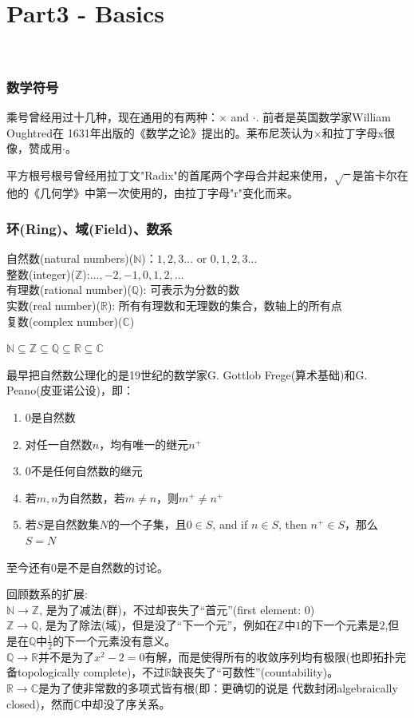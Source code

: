 \documentclass[../main.tex]{subfiles}
\begin{document}
\clearpage
\part{Part3 - Basics}\

\section{数学符号}
乘号曾经用过十几种，现在通用的有两种：$\times$ and $\cdot$. 前者是英国数学家William Oughtred在 1631年出版的《数学之论》提出的。莱布尼茨认为$\times$和拉丁字母x很像，赞成用$\cdot$。

平方根号根号曾经用拉丁文"Radix"的首尾两个字母合并起来使用，$\sqrt{\phantom{x}}$是笛卡尔在他的《几何学》中第一次使用的，由拉丁字母"r"变化而来。

\section{环(Ring)、域(Field)、数系}
自然数(natural numbers)($\mathbb{N}$)：$1,2,3\ldots$ or $0,1,2,3\ldots$\\
整数(integer)($\mathbb{Z}$):$\ldots, -2, -1, 0, 1, 2, \ldots$\\
有理数(rational number)($\mathbb{Q}$): 可表示为分数的数\\
实数(real number)($\mathbb{R}$): 所有有理数和无理数的集合，数轴上的所有点\\
复数(complex number)($\mathbb{C}$)

$\mathbb{N} \subseteq \mathbb{Z} \subseteq \mathbb{Q} \subseteq \mathbb{R} \subseteq \mathbb{C}$

最早把自然数公理化的是19世纪的数学家G. Gottlob Frege(算术基础)和G. Peano(皮亚诺公设)，即：
\vspace{-0.5em}
\begin{enumerate}
  \item $0$是自然数
  \item 对任一自然数$n$，均有唯一的继元$n^{+}$
  \item $0$不是任何自然数的继元
  \item 若$m, n$为自然数，若$m\neq n$，则$m^{+}\neq n^+$
  \item 若$S$是自然数集$N$的一个子集，且$0\in S$, and if $n \in S$, then $n^+\in S$，那么 $S=N$
\end{enumerate}
至今还有$0$是不是自然数的讨论。

回顾数系的扩展:\\
$\mathbb{N} \rightarrow \mathbb{Z}$, 是为了减法(群)，不过却丧失了“首元”(first element: 0)\\
$\mathbb{Z} \rightarrow \mathbb{Q}$, 是为了除法(域)，但是没了“下一个元”，例如在$\mathbb{Z}$中$1$的下一个元素是$2$,但是在$\mathbb{Q}$中$\frac{1}{2}$的下一个元素没有意义。\\
$\mathbb{Q} \rightarrow \mathbb{R}$并不是为了$x^2-2=0$有解，而是使得所有的收敛序列均有极限(也即拓扑完备topologically complete)，不过$\mathbb{R}$缺丧失了“可数性”(countability)。\\
$\mathbb{R} \rightarrow \mathbb{C}$是为了使非常数的多项式皆有根(即：更确切的说是 代数封闭algebraically closed)，然而$\mathbb{C}$中却没了序关系。
\end{document}

